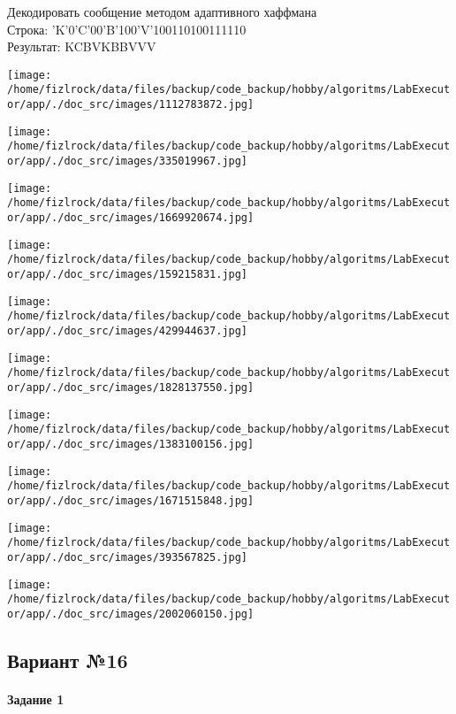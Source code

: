 \documentclass[a4paper, 12pt]{article}
\begin{document}
Декодировать сообщение методом адаптивного хаффмана \\
Строка: 
'K'0'C'00'B'100'V'100110100111110\\
Результат: KCBVKBBVVV

\texttt{[image: /home/fizlrock/data/files/backup/code\_backup/hobby/algoritms/LabExecutor/app/./doc\_src/images/1112783872.jpg]}

\texttt{[image: /home/fizlrock/data/files/backup/code\_backup/hobby/algoritms/LabExecutor/app/./doc\_src/images/335019967.jpg]}

\texttt{[image: /home/fizlrock/data/files/backup/code\_backup/hobby/algoritms/LabExecutor/app/./doc\_src/images/1669920674.jpg]}

\texttt{[image: /home/fizlrock/data/files/backup/code\_backup/hobby/algoritms/LabExecutor/app/./doc\_src/images/159215831.jpg]}

\texttt{[image: /home/fizlrock/data/files/backup/code\_backup/hobby/algoritms/LabExecutor/app/./doc\_src/images/429944637.jpg]}

\texttt{[image: /home/fizlrock/data/files/backup/code\_backup/hobby/algoritms/LabExecutor/app/./doc\_src/images/1828137550.jpg]}

\texttt{[image: /home/fizlrock/data/files/backup/code\_backup/hobby/algoritms/LabExecutor/app/./doc\_src/images/1383100156.jpg]}

\texttt{[image: /home/fizlrock/data/files/backup/code\_backup/hobby/algoritms/LabExecutor/app/./doc\_src/images/1671515848.jpg]}

\texttt{[image: /home/fizlrock/data/files/backup/code\_backup/hobby/algoritms/LabExecutor/app/./doc\_src/images/393567825.jpg]}

\texttt{[image: /home/fizlrock/data/files/backup/code\_backup/hobby/algoritms/LabExecutor/app/./doc\_src/images/2002060150.jpg]}
\pagebreak
\subsection{Вариант №16}
\paragraph{Задание 1}
\end{document}
